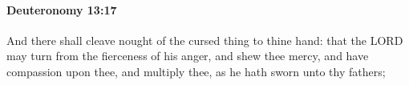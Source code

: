 
		\paragraph{Deuteronomy 13:17} %
			\label{DEUTERONOMY-13-17}

			And there shall cleave nought of the cursed thing to thine hand: that the LORD may turn from the fierceness of his anger, and shew thee mercy, and have compassion upon thee, and multiply thee, as he hath sworn unto thy fathers;


